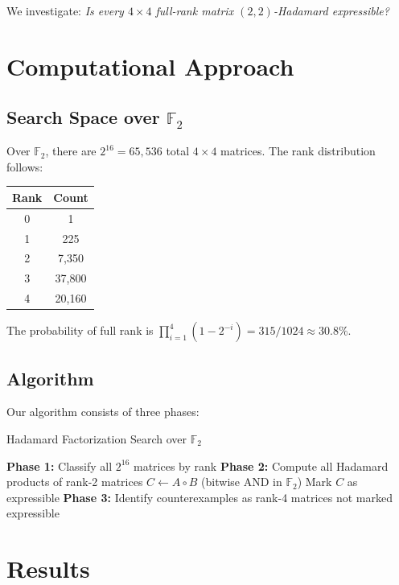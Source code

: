 \documentclass[11pt]{amsart}
\theoremstyle{plain}
\theoremstyle{definition}
\theoremstyle{remark}
\begin{document}
We investigate: \emph{Is every $4 \times 4$ full-rank matrix $(2,2)$-Hadamard expressible?}

\section{Computational Approach}

\subsection{Search Space over $\mathbb{F}_2$}

Over $\mathbb{F}_2$, there are $2^{16} = 65,536$ total $4 \times 4$ matrices. The rank distribution follows:

\begin{center}
\begin{tabular}{cc}
\toprule
Rank & Count \\
\midrule
0 & 1 \\
1 & 225 \\
2 & 7,350 \\
3 & 37,800 \\
4 & 20,160 \\
\bottomrule
\end{tabular}
\end{center}

The probability of full rank is $\prod_{i=1}^4 (1 - 2^{-i}) = 315/1024 \approx 30.8\%$.

\subsection{Algorithm}

Our algorithm consists of three phases:

\begin{algorithm}
\caption{Hadamard Factorization Search over $\mathbb{F}_2$}
\begin{algorithmic}[1]
\STATE \textbf{Phase 1:} Classify all $2^{16}$ matrices by rank
\STATE \textbf{Phase 2:} Compute all Hadamard products of rank-2 matrices
    \STATE $C \leftarrow A \circ B$ (bitwise AND in $\mathbb{F}_2$)
        \STATE Mark $C$ as expressible
    \ENDIF
\ENDFOR
\STATE \textbf{Phase 3:} Identify counterexamples as rank-4 matrices not marked expressible
\end{algorithmic}
\end{algorithm}

\section{Results}
\end{document}

